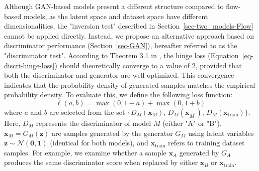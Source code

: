 \documentclass[fleqn,usenatbib]{mnras}
\begin{document}
Although GAN-based models present a different structure compared to flow-based models, as the latent space and dataset space have different dimensionalities, the "inversion test" described in Section~\ref{sec-two_models-Flow} cannot be applied directly. Instead, we propose an alternative approach based on discriminator performance (Section~\ref{sec-GAN}), hereafter referred to as the "discriminator test". According to Theorem 3.1 in \cite{Lim2017}, the hinge loss (Equation~\ref{eq-discri-hinge-loss}) should theoretically converge to a value of 2, provided that both the discriminator and generator are well optimized. This convergence indicates that the probability density of generated samples matches the empirical probability density. To evaluate this, we define the following loss function:
\begin{equation}
    \ell(a,b) = \max(0,1-a) + \max(0,1+b)
    \label{eq-hinge-loss-ab}
\end{equation}
where \(a\) and \(b\) are selected from the set $\{D_M(\bm{x}_M)$, $D_M(\bm{x}_{M^\prime})$, $D_M(\bm{x}_{\text{train}})\}$. Here, $D_M$ represents the discriminator of model $M$ (either "A" or "B"), $\bm{x}_M = G_M(\bm{z})$ are samples generated by the generator $G_M$ using latent variables $\bm{z} \sim \mathcal{N}(\bm{0},\bm{1})$ (identical for both models), and $\bm{x}_{\text{train}}$ refers to training dataset samples. For example, we examine whether a sample $\bm{x}_A$ generated by $G_A$ produces the same discriminator score when replaced by either \(\bm{x}_B\) or $\bm{x}_{\text{train}}$.
\end{document}
